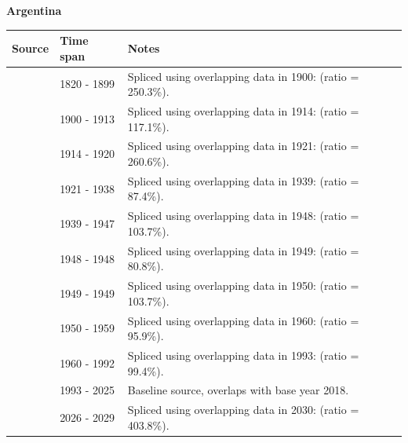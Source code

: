 \documentclass[12pt,a4paper,landscape]{article}
\begin{document}
\begin{adjustbox}{max totalsize={\paperwidth}{\paperheight},center}
\begin{minipage}[t][\textheight][t]{\textwidth}
\vspace*{0.5cm}
{}
\begin{center}
{\Large\bfseries Argentina}
\end{center}
\vspace{0.5cm}
\begin{table}[H]
\centering
\small
\begin{tabular}{|l|l|l|}
\hline
\textbf{Source} & \textbf{Time span} & \textbf{Notes} \\
\hline
\rowcolor{white}\cite{Tena}& 1820 - 1899 &Spliced using overlapping data in 1900: (ratio = 250.3\%).\\
\rowcolor{lightgray}\cite{UN_trade}& 1900 - 1913 &Spliced using overlapping data in 1914: (ratio = 117.1\%).\\
\rowcolor{white}\cite{Tena}& 1914 - 1920 &Spliced using overlapping data in 1921: (ratio = 260.6\%).\\
\rowcolor{lightgray}\cite{UN_trade}& 1921 - 1938 &Spliced using overlapping data in 1939: (ratio = 87.4\%).\\
\rowcolor{white}\cite{Mitchell}& 1939 - 1947 &Spliced using overlapping data in 1948: (ratio = 103.7\%).\\
\rowcolor{lightgray}\cite{UN_trade}& 1948 - 1948 &Spliced using overlapping data in 1949: (ratio = 80.8\%).\\
\rowcolor{white}\cite{Mitchell}& 1949 - 1949 &Spliced using overlapping data in 1950: (ratio = 103.7\%).\\
\rowcolor{lightgray}\cite{UN_trade}& 1950 - 1959 &Spliced using overlapping data in 1960: (ratio = 95.9\%).\\
\rowcolor{white}\cite{WDI}& 1960 - 1992 &Spliced using overlapping data in 1993: (ratio = 99.4\%).\\
\rowcolor{lightgray}\cite{OECD_EO}& 1993 - 2025 &Baseline source, overlaps with base year 2018.\\
\rowcolor{white}\cite{IMF_WEO_forecast}& 2026 - 2029 &Spliced using overlapping data in 2030: (ratio = 403.8\%).\\
\hline
\end{tabular}
\end{table}
\begin{figure}[H]
\centering

\end{figure}
\end{minipage}
\end{adjustbox}
\end{document}
